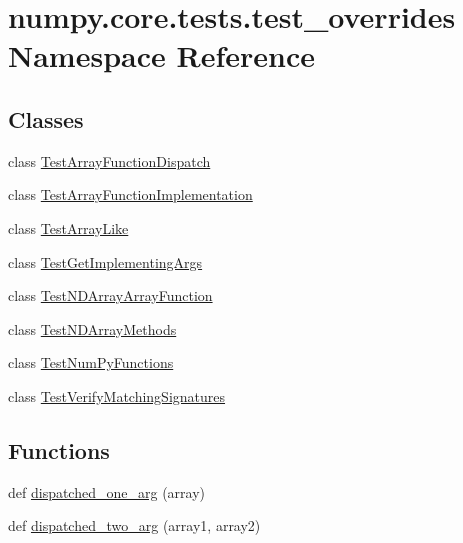 \hypertarget{namespacenumpy_1_1core_1_1tests_1_1test__overrides}{}\section{numpy.\+core.\+tests.\+test\+\_\+overrides Namespace Reference}
\label{namespacenumpy_1_1core_1_1tests_1_1test__overrides}
\subsection*{Classes}
\begin{DoxyCompactItemize}
\item 
class \hyperlink{classnumpy_1_1core_1_1tests_1_1test__overrides_1_1TestArrayFunctionDispatch}{Test\+Array\+Function\+Dispatch}
\item 
class \hyperlink{classnumpy_1_1core_1_1tests_1_1test__overrides_1_1TestArrayFunctionImplementation}{Test\+Array\+Function\+Implementation}
\item 
class \hyperlink{classnumpy_1_1core_1_1tests_1_1test__overrides_1_1TestArrayLike}{Test\+Array\+Like}
\item 
class \hyperlink{classnumpy_1_1core_1_1tests_1_1test__overrides_1_1TestGetImplementingArgs}{Test\+Get\+Implementing\+Args}
\item 
class \hyperlink{classnumpy_1_1core_1_1tests_1_1test__overrides_1_1TestNDArrayArrayFunction}{Test\+N\+D\+Array\+Array\+Function}
\item 
class \hyperlink{classnumpy_1_1core_1_1tests_1_1test__overrides_1_1TestNDArrayMethods}{Test\+N\+D\+Array\+Methods}
\item 
class \hyperlink{classnumpy_1_1core_1_1tests_1_1test__overrides_1_1TestNumPyFunctions}{Test\+Num\+Py\+Functions}
\item 
class \hyperlink{classnumpy_1_1core_1_1tests_1_1test__overrides_1_1TestVerifyMatchingSignatures}{Test\+Verify\+Matching\+Signatures}
\end{DoxyCompactItemize}
\subsection*{Functions}
\begin{DoxyCompactItemize}
\item 
def \hyperlink{namespacenumpy_1_1core_1_1tests_1_1test__overrides_aa697290d1a185c20fe5f6c06825c10fa}{dispatched\+\_\+one\+\_\+arg} (array)
\item 
def \hyperlink{namespacenumpy_1_1core_1_1tests_1_1test__overrides_ae31554f9c457e3aec7bdcef508354f7c}{dispatched\+\_\+two\+\_\+arg} (array1, array2)
\end{DoxyCompactItemize}
